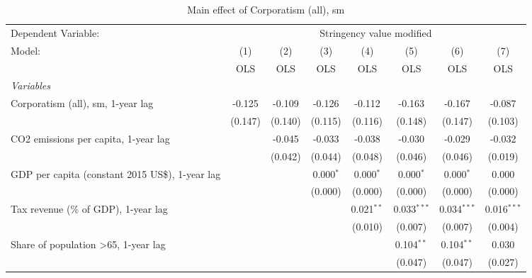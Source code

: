
\begin{table}[htbp]
   \caption{Main effect of Corporatism (all), sm}
   \centering
   \begin{tabular}{lccccccc}
      \toprule
      Dependent Variable: & \multicolumn{7}{c}{Stringency value modified}\\
      Model:                                                & (1)     & (2)     & (3)         & (4)          & (5)           & (6)           & (7)\\  
                                                            &  OLS    & OLS     & OLS         & OLS          & OLS           & OLS           & OLS\\  
      \midrule
      \emph{Variables}\\
      Corporatism (all), sm, 1-year lag                     & -0.125  & -0.109  & -0.126      & -0.112       & -0.163        & -0.167        & -0.087\\   
                                                            & (0.147) & (0.140) & (0.115)     & (0.116)      & (0.148)       & (0.147)       & (0.103)\\   
      CO2 emissions per capita, 1-year lag                  &         & -0.045  & -0.033      & -0.038       & -0.030        & -0.029        & -0.032\\   
                                                            &         & (0.042) & (0.044)     & (0.048)      & (0.046)       & (0.046)       & (0.019)\\   
      GDP per capita (constant 2015 US\$), 1-year lag       &         &         & 0.000$^{*}$ & 0.000$^{*}$  & 0.000$^{*}$   & 0.000$^{*}$   & 0.000\\   
                                                            &         &         & (0.000)     & (0.000)      & (0.000)       & (0.000)       & (0.000)\\   
      Tax revenue (\% of GDP), 1-year lag                   &         &         &             & 0.021$^{**}$ & 0.033$^{***}$ & 0.034$^{***}$ & 0.016$^{***}$\\   
                                                            &         &         &             & (0.010)      & (0.007)       & (0.007)       & (0.004)\\   
      Share of population >65, 1-year lag                   &         &         &             &              & 0.104$^{**}$  & 0.104$^{**}$  & 0.030\\   
                                                            &         &         &             &              & (0.047)       & (0.047)       & (0.027)\\   

\end{tabular}
\end{table}
